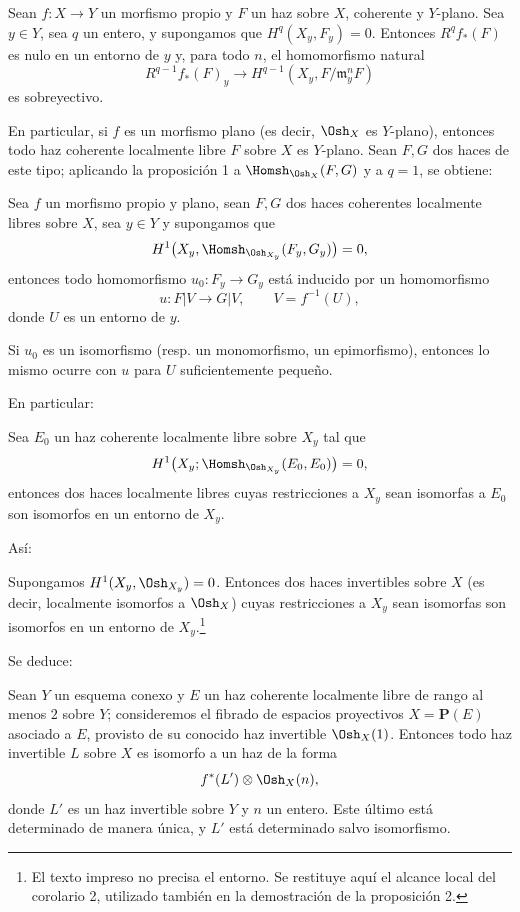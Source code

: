  Sean $f:X\longrightarrow Y$ un morfismo propio y $F$
un haz sobre $X$, coherente y $Y$-plano. Sea $y\in Y$, sea $q$ un entero, y
supongamos que $H^q(X_y,F_y)=0$. Entonces $R^qf_*(F)$ es nulo en un entorno de
$y$ y, para todo $n$, el homomorfismo natural
\[
  R^{q-1}f_*(F)_y\longrightarrow
  H^{q-1}(X_y,F/\mathfrak m_y^nF)
\]
es sobreyectivo.

En particular, si $f$ es un morfismo plano (es decir, $\Osh_X$ es $Y$-plano),
entonces todo haz coherente localmente libre $F$ sobre $X$ es $Y$-plano. Sean
$F,G$ dos haces de este tipo; aplicando la proposición 1 a
$\Homsh_{\Osh_X}(F,G)$ y a $q=1$, se obtiene:

 Sea $f$ un morfismo propio y plano, sean $F,G$ dos haces
coherentes localmente libres sobre $X$, sea $y\in Y$ y supongamos que
\[
  H^1\bigl(X_y,\Homsh_{\Osh_{X_y}}(F_y,G_y)\bigr)=0,
\]
entonces todo homomorfismo $u_0:F_y\longrightarrow G_y$ está inducido por un
homomorfismo
\[
  u:F|V\longrightarrow G|V,
  \qquad V=f^{-1}(U),
\]
donde $U$ es un entorno de $y$.

 Si $u_0$ es un isomorfismo (resp. un monomorfismo, un
epimorfismo), entonces lo mismo ocurre con $u$ para $U$ suficientemente
pequeño.

En particular:

 Sea $E_0$ un haz coherente localmente libre sobre $X_y$
tal que
\[
  H^1\bigl(X_y;\Homsh_{\Osh_{X_y}}(E_0,E_0)\bigr)=0,
\]
entonces dos haces localmente libres cuyas restricciones a $X_y$ sean isomorfas
a $E_0$ son isomorfos en un entorno de $X_y$.

Así:

 Supongamos $H^1(X_y,\Osh_{X_y})=0$. Entonces dos haces
invertibles sobre $X$ (es decir, localmente isomorfos a $\Osh_X$) cuyas
restricciones a $X_y$ sean isomorfas son isomorfos en un entorno de $X_y$.\footnote{El texto impreso no precisa el entorno. Se restituye aquí el alcance local del corolario 2, utilizado también en la demostración de la proposición 2.}

Se deduce:

 Sean $Y$ un esquema conexo y $E$ un haz coherente localmente libre de rango al menos $2$ sobre $Y$; consideremos el fibrado de espacios proyectivos
$X=\mathbf P(E)$ asociado a $E$, provisto de su conocido haz invertible
$\Osh_X(1)$. Entonces todo haz invertible $L$ sobre $X$ es isomorfo a un haz de
la forma
\[
  f^*(L')\otimes\Osh_X(n),
\]
donde $L'$ es un haz invertible sobre $Y$ y $n$ un entero. Este último está
determinado de manera única, y $L'$ está determinado salvo isomorfismo.

